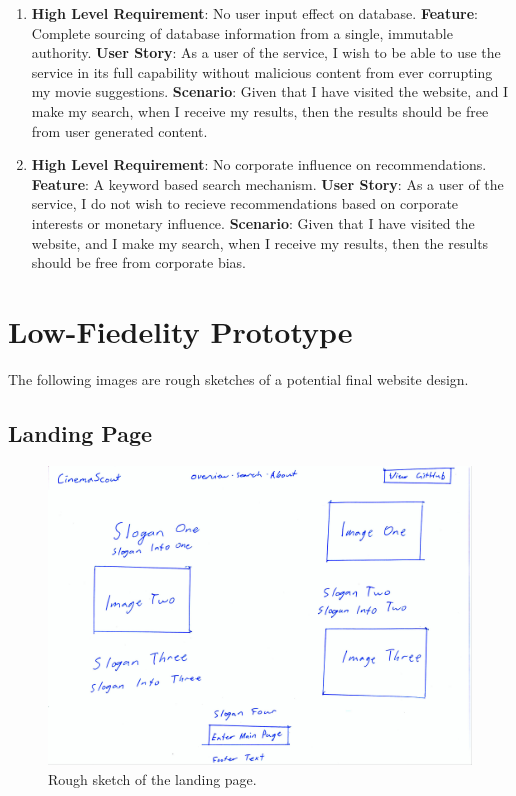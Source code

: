\documentclass{article}
\begin{document}
\begin{enumerate}
\item
\textbf{High Level Requirement}: No user input effect on database.
\newline
\textbf{Feature}:
Complete sourcing of database information from a single, immutable authority.
\newline
\textbf{User Story}:
As a user of the service, I wish to be able to use the service in its full 
capability without malicious content from ever corrupting my movie suggestions.
\newline
\textbf{Scenario}:
Given that I have visited the website, and I make my search, when I receive my
results, then the results should be free from user generated content.
\newline

\item
\textbf{High Level Requirement}: No corporate influence on recommendations.
\newline
\textbf{Feature}:
A keyword based search mechanism.
\newline
\textbf{User Story}:
As a user of the service, I do not wish to recieve recommendations based on
corporate interests or monetary influence.
\newline
\textbf{Scenario}:
Given that I have visited the website, and I make my search, when I receive my
results, then the results should be free from corporate bias.
\newline
\end{enumerate}

\section{Low-Fiedelity Prototype}
The following images are rough sketches of a potential final website design.
\subsection{Landing Page}
\begin{figure}[H]
\includegraphics[width=\columnwidth]{res/landing.jpg}
\caption{Rough sketch of the landing page.}
\end{figure}
\end{document}
